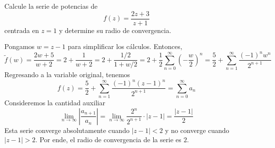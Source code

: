 \begin{exercise}
Calcule la serie de potencias de
$$f(z) = \frac {2z + 3} {z + 1}$$
centrada en $z = 1$ y determine su radio de convergencia.
\end{exercise}

\begin{solution}
Pongamos $w = z - 1$ para simplificar los cálculos. Entonces,
$$
\tilde f(w)
    = \frac {2w + 5} {w + 2}
    = 2 + \frac 1 {w + 2}
    = 2 + \frac {1/2} {1 + w/2}
    = 2 + \frac 12 \sum_{n=0}^\infty \left ( -\frac w2 \right)^n
    = \frac 52 + \sum_{n=1}^\infty \frac {(-1)^n w^n} {2^{n+1}}
$$
Regresando a la variable original, tenemos
$$f(z) = \frac 52 + \sum_{n=1}^\infty \frac {(-1)^n (z-1)^n} {2^{n+1}} = \sum_{n=0}^\infty a_n$$
Consideremos la cantidad auxiliar
$$
\lim_{n \to \infty} \left| \frac {a_{n+1}} {a_n} \right|
    = \lim_{n \to \infty} \frac {2^n} {2^{n+1}} \cdot |z-1|
    = \frac {|z-1|} 2
$$
Esta serie converge absolutamente cuando $|z-1| < 2$ y no converge cuando $|z-1| > 2$. Por ende, el radio de convergencia de la serie es $2$.
\end{solution}
